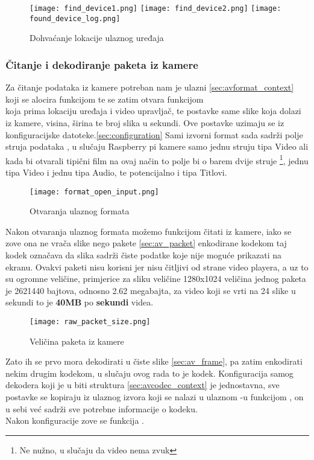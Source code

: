 \begin{figure}[h]
  \texttt{[image: find\_device1.png]}
  \texttt{[image: find\_device2.png]}
  \texttt{[image: found\_device\_log.png]}
  \caption{Dohvaćanje lokacije ulaznog uređaja}
\end{figure}

\subsubsection{Čitanje i dekodiranje paketa iz kamere}
Za čitanje podataka iz kamere potreban nam je ulazni  \ref{sec:avformat_context} koji se alocira funkcijom 
 te se zatim otvara funkcijom \\
 koja prima lokaciju uređaja  i video upravljač, te postavke same slike koja dolazi
iz kamere, visina, širina te broj slika u sekundi.
Ove postavke uzimaju se iz konfiguracijske datoteke.\ref{sec:configuration}
\paraBreak
Sami izvorni format sada sadrži polje struja podataka , u slučaju Raspberry pi kamere samo jednu struju
tipa Video ali kada bi otvarali tipični film na ovaj način to polje bi o barem dvije struje 
\footnote{Ne nužno, u slučaju da video nema zvuk}, jednu tipa Video i jednu tipa Audio, te potencijalno i tipa Titlovi.

\begin{figure}[h]
  \texttt{[image: format\_open\_input.png]}
  \caption{Otvaranja ulaznog formata}
\end{figure}

Nakon otvaranja ulaznog formata možemo funkcijom  čitati iz kamere, iako se zove 
 ona ne vrača slike nego pakete \ref{sec:av_packet} enkodirane  kodekom taj
kodek označava da slika sadrži čiste podatke koje nije moguće prikazati na ekranu. \cite{ffmpegBook}
\paraBreak
Ovakvi paketi nisu korisni jer nisu čitljivi od strane video playera, a uz to su ogromne veličine, primjerice za sliku
veličine 1280x1024 veličina jednog paketa je 2621440 bajtova, odnosno 2.62 megabajta, za video koji se vrti
na 24 slike u sekundi to je \textbf{40MB} po \textbf{sekundi} videa.\

\begin{figure}[h]
  \centering
  \texttt{[image: raw\_packet\_size.png]}
  \caption{\small Veličina  paketa iz kamere}
\end{figure}
\noindent
Zato ih se prvo mora dekodirati u čiste slike \ref{sec:av_frame}, pa zatim enkodirati nekim drugim kodekom, 
u slučaju ovog rada to je  kodek.
\paraBreak
Konfiguracija samog dekodera koji je u biti struktura  \ref{sec:avcodec_context} je
jednostavna, sve postavke se kopiraju iz ulaznog izvora koji se nalazi u ulaznom -u funkcijom
, on u sebi već sadrži sve potrebne informacije o kodeku.
\\
Nakon konfiguracije zove se funkcija .
\clearpage

